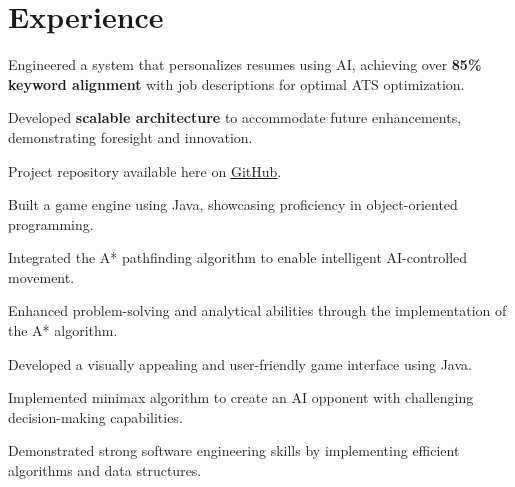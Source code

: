 \section{Experience}


    \begin{tightemize}
        \item Engineered a system that personalizes resumes using AI, achieving over \textbf{85\% keyword alignment} with job descriptions for optimal ATS optimization.
        \item Developed \textbf{scalable architecture} to accommodate future enhancements, demonstrating foresight and innovation.
        \item Project repository available here on \href{https://github.com/vmsaif/ats-pass-ai}{\ul{GitHub}}.
    \end{tightemize}


    \begin{tightemize}
        \item Built a game engine using Java, showcasing proficiency in object-oriented programming.
        \item Integrated the A* pathfinding algorithm to enable intelligent AI-controlled movement.
        \item Enhanced problem-solving and analytical abilities through the implementation of the A* algorithm.
    \end{tightemize}


    \begin{tightemize}
        \item Developed a visually appealing and user-friendly game interface using Java.
        \item Implemented minimax algorithm to create an AI opponent with challenging decision-making capabilities.
        \item Demonstrated strong software engineering skills by implementing efficient algorithms and data structures.
    \end{tightemize}